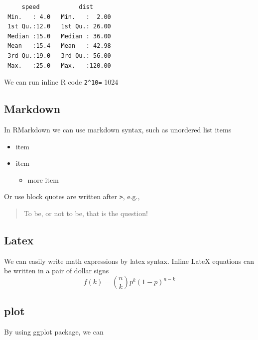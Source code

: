 \documentclass[
]{article}
\providecommand{\tightlist}{%
  \setlength{\itemsep}{0pt}\setlength{\parskip}{0pt}}
\begin{document}
\begin{verbatim}
     speed           dist       
 Min.   : 4.0   Min.   :  2.00  
 1st Qu.:12.0   1st Qu.: 26.00  
 Median :15.0   Median : 36.00  
 Mean   :15.4   Mean   : 42.98  
 3rd Qu.:19.0   3rd Qu.: 56.00  
 Max.   :25.0   Max.   :120.00  
\end{verbatim}

We can run inline R code \texttt{2\^{}10=} 1024

\hypertarget{markdown}{%
\subsection{Markdown}\label{markdown}}

In RMarkdown we can use markdown syntax, such as unordered list items

\begin{itemize}
\tightlist
\item
  item
\item
  item

  \begin{itemize}
  \tightlist
  \item
    more item
  \end{itemize}
\end{itemize}

Or use block quotes are written after \texttt{\textgreater{}}, e.g.,

\begin{quote}
To be, or not to be, that is the question!
\end{quote}

\hypertarget{latex}{%
\subsection{Latex}\label{latex}}

We can easily write math expressions by latex syntax. Inline LateX
equations can be written in a pair of dollar signs
\[f\left(k\right)=\binom{n}{k}p^k\left(1-p\right)^{n-k}\]

\hypertarget{plot}{%
\subsection{plot}\label{plot}}

By using ggplot package, we can
\end{document}
